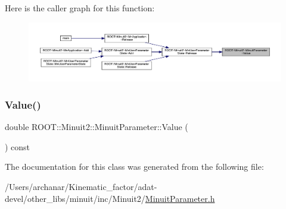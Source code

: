 Here is the caller graph for this function\+:
\nopagebreak
\begin{figure}[H]
\begin{center}
\leavevmode
\includegraphics[width=350pt]{dd/dfb/classROOT_1_1Minuit2_1_1MinuitParameter_ac77aed82006ba9e9598df49a1753d31c_icgraph}
\end{center}
\end{figure}
\mbox{\label{classROOT_1_1Minuit2_1_1MinuitParameter_ac77aed82006ba9e9598df49a1753d31c}} 
\subsubsection{\texorpdfstring{Value()}{Value()}\hspace{0.1cm}{\footnotesize\ttfamily [3/3]}}
{\footnotesize\ttfamily double R\+O\+O\+T\+::\+Minuit2\+::\+Minuit\+Parameter\+::\+Value (\begin{DoxyParamCaption}{ }\end{DoxyParamCaption}) const\hspace{0.3cm}{\ttfamily [inline]}}



The documentation for this class was generated from the following file\+:\begin{DoxyCompactItemize}
\item 
/\+Users/archanar/\+Kinematic\+\_\+factor/adat-\/devel/other\+\_\+libs/minuit/inc/\+Minuit2/\mbox{\hyperlink{adat-devel_2other__libs_2minuit_2inc_2Minuit2_2MinuitParameter_8h}{Minuit\+Parameter.\+h}}\end{DoxyCompactItemize}
